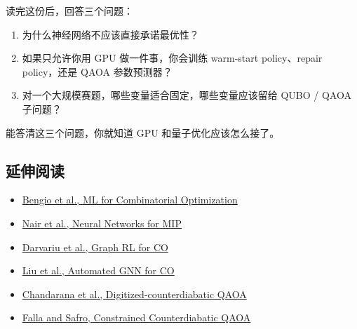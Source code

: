 \documentclass[UTF8,12pt,a4paper]{ctexart}
\begin{document}
读完这份后，回答三个问题：

\begin{enumerate}
\item 为什么神经网络不应该直接承诺最优性？
\item 如果只允许你用 GPU 做一件事，你会训练 warm-start policy、repair policy，还是 QAOA 参数预测器？
\item 对一个大规模赛题，哪些变量适合固定，哪些变量应该留给 QUBO / QAOA 子问题？
\end{enumerate}

能答清这三个问题，你就知道 GPU 和量子优化应该怎么接了。

\subsection*{延伸阅读}

\begin{itemize}
\item \href{https://arxiv.org/abs/1811.06128}{Bengio et al., ML for Combinatorial Optimization}
\item \href{https://arxiv.org/abs/2012.13349}{Nair et al., Neural Networks for MIP}
\item \href{https://arxiv.org/abs/2404.06492}{Darvariu et al., Graph RL for CO}
\item \href{https://arxiv.org/abs/2406.02872}{Liu et al., Automated GNN for CO}
\item \href{https://arxiv.org/abs/2107.02789}{Chandarana et al., Digitized-counterdiabatic QAOA}
\item \href{https://arxiv.org/abs/2605.06858}{Falla and Safro, Constrained Counterdiabatic QAOA}
\end{itemize}
\end{document}
